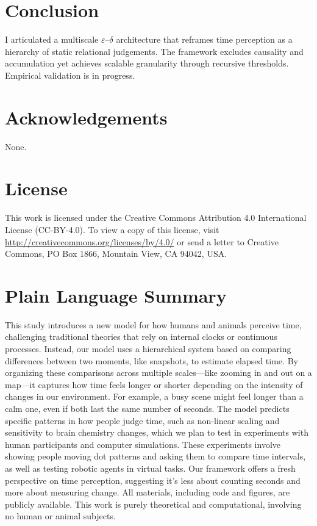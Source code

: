 \documentclass[preprint,11pt]{elsarticle}
\begin{document}
\section{Conclusion}
I articulated a multiscale $\varepsilon$--$\delta$ architecture that
reframes time perception as a hierarchy of static relational
judgements.  The framework excludes causality and accumulation yet
achieves scalable granularity through recursive thresholds.
Empirical validation is in progress.

\section*{Acknowledgements}
None.

\section*{License}
This work is licensed under the Creative Commons Attribution 4.0 International License (CC-BY-4.0). To view a copy of this license, visit \url{http://creativecommons.org/licenses/by/4.0/} or send a letter to Creative Commons, PO Box 1866, Mountain View, CA 94042, USA.

\appendix

\section{Plain Language Summary}
\label{app:plain_summary}

This study introduces a new model for how humans and animals perceive time, challenging traditional theories that rely on internal clocks or continuous processes. Instead, our model uses a hierarchical system based on comparing differences between two moments, like snapshots, to estimate elapsed time. By organizing these comparisons across multiple scales---like zooming in and out on a map---it captures how time feels longer or shorter depending on the intensity of changes in our environment. For example, a busy scene might feel longer than a calm one, even if both last the same number of seconds. The model predicts specific patterns in how people judge time, such as non-linear scaling and sensitivity to brain chemistry changes, which we plan to test in experiments with human participants and computer simulations. These experiments involve showing people moving dot patterns and asking them to compare time intervals, as well as testing robotic agents in virtual tasks. Our framework offers a fresh perspective on time perception, suggesting it's less about counting seconds and more about measuring change. All materials, including code and figures, are publicly available. This work is purely theoretical and computational, involving no human or animal subjects.



\end{document}
